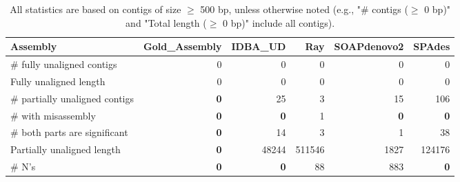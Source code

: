 \documentclass[12pt,a4paper]{article}
\begin{document}
\begin{table}[ht]
\begin{center}
\caption{All statistics are based on contigs of size $\geq$ 500 bp, unless otherwise noted (e.g., "\# contigs ($\geq$ 0 bp)" and "Total length ($\geq$ 0 bp)" include all contigs).}
\begin{tabular}{|l*{5}{|r}|}
\hline
Assembly & Gold\_Assembly & IDBA\_UD & Ray & SOAPdenovo2 & SPAdes \\ \hline
\# fully unaligned contigs & 0 & 0 & 0 & 0 & 0 \\ \hline
Fully unaligned length & 0 & 0 & 0 & 0 & 0 \\ \hline
\# partially unaligned contigs & {\bf 0} & 25 & 3 & 15 & 106 \\ \hline
\hspace{5mm}\# with misassembly & {\bf 0} & {\bf 0} & 1 & {\bf 0} & {\bf 0} \\ \hline
\hspace{5mm}\# both parts are significant & {\bf 0} & 14 & 3 & 1 & 38 \\ \hline
Partially unaligned length & {\bf 0} & 48244 & 511546 & 1827 & 124176 \\ \hline
\# N's & {\bf 0} & {\bf 0} & 88 & 883 & {\bf 0} \\ \hline
\end{tabular}
\end{center}
\end{table}
\end{document}
